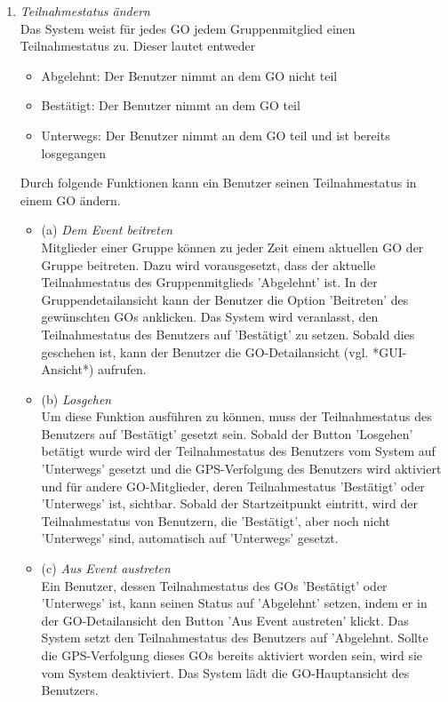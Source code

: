 \documentclass[parskip=full]{scrartcl}
\def\threedigits#1{%
  \ifnum#1<100 0\fi
  \ifnum#1<10 0\fi
  \number#1}
\begin{document}
\begin{enumerate}[label={\textbf{/F\protect\threedigits{\theenumi}0/}}, leftmargin=*, resume]
	\item \textit{Teilnahmestatus ändern}\label{Teilnahmestatus} \\
	Das System weist für jedes GO jedem Gruppenmitglied einen Teilnahmestatus zu. Dieser lautet entweder
	\begin{itemize}
		\item Abgelehnt: Der Benutzer nimmt an dem GO nicht teil
		\item Bestätigt: Der Benutzer nimmt an dem GO teil
		\item Unterwegs: Der Benutzer nimmt an dem GO teil und ist bereits losgegangen
	\end{itemize}
Durch folgende Funktionen kann ein Benutzer seinen Teilnahmestatus in einem GO ändern.

	\begin{itemize}
	\item (a) \textit{Dem Event beitreten} \label{GO-Anfrage} \\
	Mitglieder einer Gruppe können zu jeder Zeit einem aktuellen GO der Gruppe beitreten. Dazu wird vorausgesetzt, dass der aktuelle Teilnahmestatus des Gruppenmitglieds 'Abgelehnt' ist. In der Gruppendetailansicht kann der Benutzer die Option 'Beitreten' des gewünschten GOs anklicken. Das System wird  veranlasst, den Teilnahmestatus des Benutzers auf 'Bestätigt' zu setzen. Sobald dies geschehen ist, kann der Benutzer die GO-Detailansicht (vgl. *GUI-Ansicht*) aufrufen.
	
	\item (b) \textit{Losgehen}\label{losgehen} \\
	Um diese Funktion ausführen zu können, muss der Teilnahmestatus des Benutzers auf 'Bestätigt' gesetzt sein. Sobald der Button 'Losgehen' betätigt wurde wird der Teilnahmestatus des Benutzers vom System auf 'Unterwegs' gesetzt und die GPS-Verfolgung des Benutzers wird aktiviert und für andere GO-Mitglieder, deren Teilnahmestatus 'Bestätigt' oder 'Unterwegs' ist, sichtbar. Sobald der Startzeitpunkt eintritt, wird der Teilnahmestatus von Benutzern, die 'Bestätigt', aber noch nicht 'Unterwegs' sind, automatisch auf 'Unterwegs' gesetzt.
	
	\item (c) \textit{Aus Event austreten}\label{austreten} \\
Ein Benutzer, dessen Teilnahmestatus des GOs 'Bestätigt' oder 'Unterwegs' ist, kann seinen Status auf 'Abgelehnt' setzen, indem er in der GO-Detailansicht den Button 'Aus Event austreten' klickt. Das System setzt den Teilnahmestatus des Benutzers auf 'Abgelehnt. Sollte die GPS-Verfolgung dieses GOs bereits aktiviert worden sein, wird sie vom System deaktiviert. Das System lädt die GO-Hauptansicht des Benutzers.
	

\end{itemize}
\end{enumerate}
\end{document}
